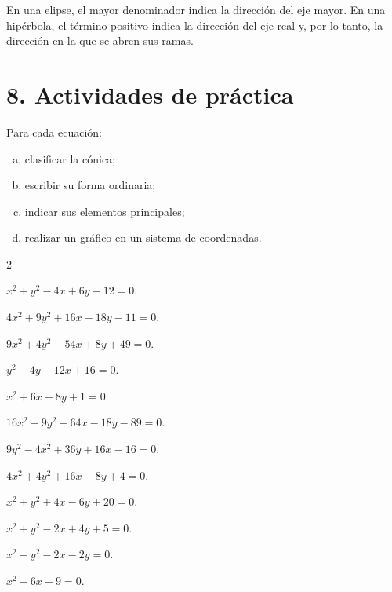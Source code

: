 \documentclass[11pt]{article}
\def\identacion{-2.5mm}%
\begin{document}
\begin{mdframed}[style=ObsSty,frametitle={Atención con los denominadores}]
En una elipse, el mayor denominador indica la dirección del eje mayor. En una hipérbola, el término positivo indica la dirección del eje real y, por lo tanto, la dirección en la que se abren sus ramas.
\end{mdframed}


\section*{8. Actividades de práctica}

\begin{mdframed}[style=EjerSty,frametitle={Actividad 1: reconocer, reducir y graficar}]
Para cada ecuación:
\begin{enumerate}[a)]
    \item clasificar la cónica;
    \item escribir su forma ordinaria;
    \item indicar sus elementos principales;
    \item realizar un gráfico en un sistema de coordenadas.
\end{enumerate}
\end{mdframed}

\begin{enumerate}[\hspace*{\identacion}1)]
\begin{multicols}{2}
\item $x^2+y^2-4x+6y-12=0$.
\item $4x^2+9y^2+16x-18y-11=0$.
\item $9x^2+4y^2-54x+8y+49=0$.
\item $y^2-4y-12x+16=0$.
\item $x^2+6x+8y+1=0$.
\item $16x^2-9y^2-64x-18y-89=0$.
\item $9y^2-4x^2+36y+16x-16=0$.
\item $4x^2+4y^2+16x-8y+4=0$.
\item $x^2+y^2+4x-6y+20=0$.
\item $x^2+y^2-2x+4y+5=0$.
\item $x^2-y^2-2x-2y=0$.
\item $x^2-6x+9=0$.
\end{multicols}
\end{enumerate}
\end{document}
